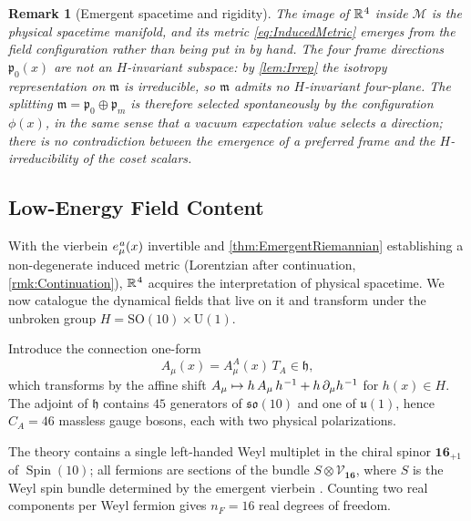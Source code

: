 \documentclass[pdflatex,sn-mathphys-num]{sn-jnl}
\theoremstyle{thmstyleone}
\theoremstyle{thmstyletwo}%
\newtheorem{remark}{Remark}%
\theoremstyle{thmstylethree}%
\newcommand{\SO}[1]{\mathrm{SO(#1)}}
\newcommand{\U}[1]{\mathrm{U(#1)}}
\newcommand{\M}{\mathcal{M}}
\newcommand{\SOTen}{\SO{10}}
\newcommand{\UOne}{\U{1}}
\newcommand{\SOTenXUOne}{\SOTen \times \UOne}
\newcommand{\sm}{\hspace{.065em}}
\newcommand{\Spin}{\operatorname{Spin}}
\newcommand{\smexp}[1]{^{\sm #1}}
\begin{document}
\begin{remark}[Emergent spacetime and rigidity]\label{rmk:Emergent}
The image of $\mathbb R\smexp{4}$ inside $\M$ is the physical spacetime
manifold, and its metric \eqref{eq:InducedMetric} emerges from the field
configuration rather than being put in by hand. The four frame directions
$\mathfrak p_{0}(x)$ are \emph{not} an $H$-invariant subspace: by
\autoref{lem:Irrep} the isotropy representation on $\mathfrak m$ is irreducible,
so $\mathfrak m$ admits no $H$-invariant four-plane. The splitting
$\mathfrak m=\mathfrak p_{0}\oplus\mathfrak p_{m}$ is therefore selected
\emph{spontaneously} by the configuration $\phi(x)$, in the same sense that a
vacuum expectation value selects a direction; there is no contradiction between
the emergence of a preferred frame and the $H$-irreducibility of the coset
scalars.
\end{remark}


\subsection{Low-Energy Field Content}
\label{subsec:FieldContent}

With the vierbein $e_{\mu}\smexp{a}(x)$ invertible and
\autoref{thm:EmergentRiemannian} establishing a non-degenerate induced metric
(Lorentzian after continuation, \autoref{rmk:Continuation}),
$\mathbb R\smexp{4}$ acquires the interpretation of physical spacetime.  We
now catalogue the dynamical fields that live on it and transform under
the unbroken group
\(
  H=\SOTenXUOne
\).

Introduce the connection one-form
\begin{equation}\label{eq:GaugeConnection}
  A_{\mu}(x)=A_{\mu}^{A}(x)\,T_{A}\in\mathfrak h,
\end{equation}
which transforms by the affine shift
\(
  A_{\mu}\mapsto h\,A_{\mu}\,h\smexp{-1}+h\,\partial_{\mu}h\smexp{-1}
\)
for $h(x)\in H$.  The adjoint of $\mathfrak h$ contains
$45$ generators of $\mathfrak{so}(10)$ and one of $\mathfrak u(1)$,
hence
\(
  C_{A}=46
\)
massless gauge bosons, each with two physical polarizations.

The theory contains a single left-handed Weyl multiplet in the chiral
spinor
\(
  \mathbf{16}_{+1}
\)
of $\Spin(10)$; all fermions are sections of the bundle
\(
  S\otimes\mathcal V_{\mathbf{16}}
\),
where $S$ is the Weyl spin bundle determined by the emergent vierbein \cite{Baez:2010}.  Counting two real components per Weyl fermion gives
\(
  n_{F}=16
\)
real degrees of freedom.
\end{document}
